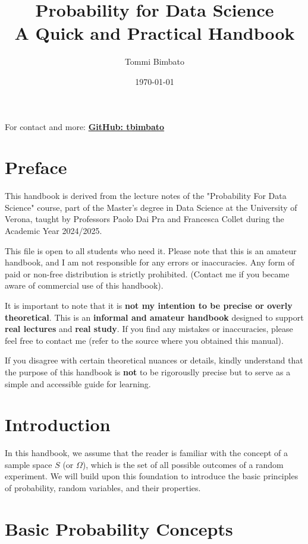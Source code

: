\documentclass[a4paper]{article}
\title{Probability for Data Science \\ A Quick and Practical Handbook}
\author{Tommi Bimbato}
\date{\today}
\begin{document}
\maketitle
\vspace{1cm} %
\small
\begin{center}
    For contact and more: \href{https://github.com/tbimbato}{\textbf{GitHub: tbimbato}}
\end{center}
\newpage 
\normalsize

\section*{Preface}

This handbook is derived from the lecture notes of the "Probability For Data Science" course, part of the Master's degree in Data Science at the University of Verona, taught by Professors Paolo Dai Pra and Francesca Collet during the Academic Year 2024/2025.

This file is open to all students who need it. Please note that this is an amateur handbook, and I am not responsible for any errors or inaccuracies. Any form of paid or non-free distribution is strictly prohibited. (Contact me if you became aware of commercial use of this handbook).

It is important to note that it is \textbf{not my intention to be precise or overly theoretical}. This is an \textbf{informal and amateur handbook} designed to support \textbf{real lectures} and \textbf{real study}. If you find any mistakes or inaccuracies, please feel free to contact me (refer to the source where you obtained this manual). 

If you disagree with certain theoretical nuances or details, kindly understand that the purpose of this handbook is \textbf{not} to be rigorouslly precise but to serve as a simple and accessible guide for learning.
\newpage 
\tableofcontents
\newpage

\section{Introduction}
In this handbook, we assume that the reader is familiar with the concept of a sample space \( S \) (or \( \Omega \)), which is the set of all possible outcomes of a random experiment. We will build upon this foundation to introduce the basic principles of probability, random variables, and their properties.

\section{Basic Probability Concepts}
\end{document}
